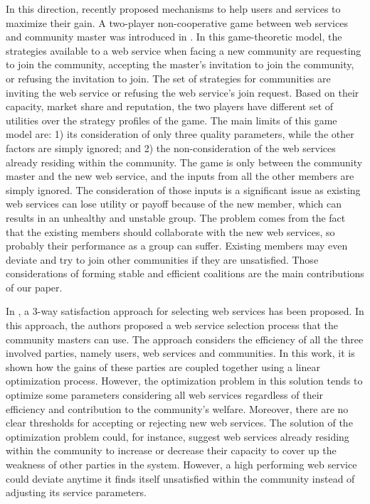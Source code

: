 \documentclass[10pt,journal,cspaper,compsoc]{IEEEtran}
\begin{document}
In this direction, recently \cite{DBLP:conf/IEEEscc/LimTMB12,
DBLP:conf/IEEEscc/KhosravifarABT11, 10.1109/TSC.2012.12} proposed mechanisms to help
users and services to maximize their gain. A two-player
non-cooperative game between web services and community master was
introduced in \cite{DBLP:conf/IEEEscc/KhosravifarABT11}. In this
game-theoretic model, the strategies available to a web service
when facing a new community are requesting to join the community,
accepting the master's invitation to join the community, or
refusing the invitation to join. The set of strategies for
communities are inviting the web service or refusing the web
service's join request. Based on their capacity, market share and
reputation, the two players have different set of utilities over
the strategy profiles of the game. The main limits of this game
model are: 1) its consideration of only three quality parameters,
while the other factors are simply ignored; and 2) the
non-consideration of the web services already residing within the
community. The game is only between the community master and the
new web service, and the inputs from all the other members are
simply ignored. The consideration of those inputs is a significant
issue as existing web services can lose utility or payoff because
of the new member, which can results in an unhealthy and unstable
group. The problem comes from the fact that the existing members
should collaborate with the new web services, so probably their
performance as a group can suffer. Existing members may even
deviate and try to join other communities if they are unsatisfied.
Those considerations of forming stable and efficient coalitions
are the main contributions of our paper.

In \cite{DBLP:conf/IEEEscc/LimTMB12}, a 3-way satisfaction approach
for selecting web services has been proposed. In this approach,
the authors proposed a web service selection process that the
community masters can use. The approach considers the efficiency
of all the three involved parties, namely users, web services and
communities. In this work, it is shown how the gains of these
parties are coupled together using a linear optimization process.
However, the optimization problem in this solution tends to
optimize some parameters considering all web services regardless
of their efficiency and contribution to the community's welfare.
Moreover, there are no clear thresholds for accepting or rejecting
new web services. The solution of the optimization problem could,
for instance, suggest web services already residing within the
community to increase or decrease their capacity to cover up the
weakness of other parties in the system. However, a high
performing web service could deviate anytime it finds itself
unsatisfied within the community instead of adjusting its service
parameters.
\end{document}
